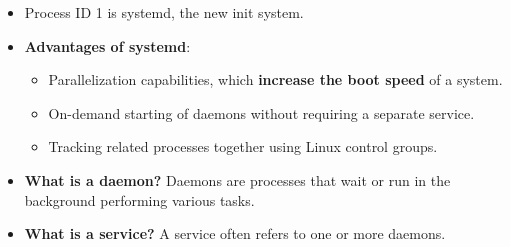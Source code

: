 
\begin{flushleft}
	\bigskip
	\bigskip
	\begin{itemize}
	\item Process ID 1 is systemd, the new init system.
	\item \textbf{Advantages of systemd}:
	\begin{itemize}
		\item Parallelization capabilities, which \textbf{increase the boot speed} of a system.
		\item On-demand starting of daemons without requiring a separate service.
		\item Tracking related processes together using Linux control groups.
	\end{itemize}
	\item \textbf{What is a daemon?} 
	\newline
	Daemons are processes that wait or run in the background performing various tasks.
	\item \textbf{What is a service?}
	\newline
	A service often refers to one or more daemons.
	\end{itemize}
\end{flushleft}

\newpage

